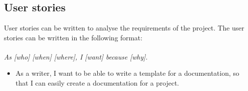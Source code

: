 \appendix
\section*{\appendixname}
\renewcommand{\thesubsection}{\Alph{subsection}}

\subsection{User stories} \label{userStories}
User stories can be written to analyse the requirements of the project. The user stories can be written in the following format:
\\
\\
\textit{As [who] [when] [where], I [want] because [why].} \cite{Connextra}
\\
\begin{itemize}
    \item As a writer, I want to be able to write a template for a documentation, so that I can easily create a documentation for a project.
\end{itemize}




%